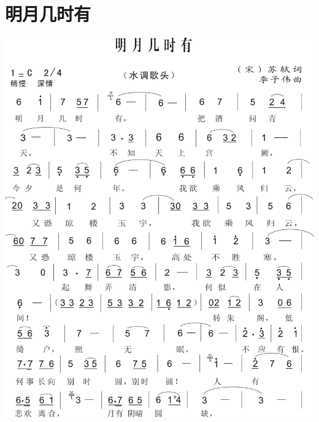 \documentclass[cn,pad,twocol]{elegantbook}
\begin{document}
\section{明月几时有}
    \includegraphics[width=\textwidth]{dongxiao/20200411-明月几时有.jpg}
\end{document}
